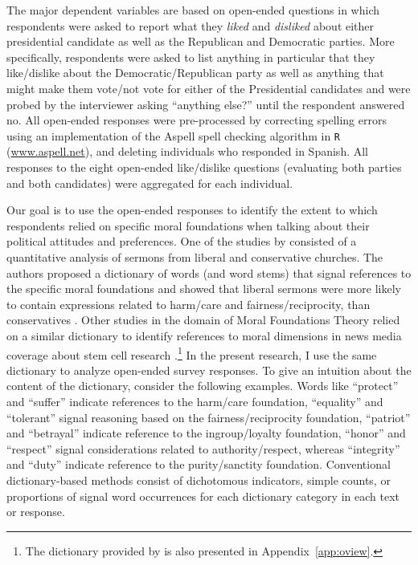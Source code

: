 \documentclass[12pt]{article}
\begin{document}
The major dependent variables are based on open-ended questions in which respondents were asked to report what they \textit{liked} and \textit{disliked} about either presidential candidate as well as the Republican and Democratic parties. More specifically, respondents were asked to list anything in particular that they like/dislike about the Democratic/Republican party as well as anything that might make them vote/not vote for either of the Presidential candidates and were probed by the interviewer asking ``anything else?'' until the respondent answered no. All open-ended responses were pre-processed by correcting spelling errors using an implementation of the Aspell spell checking algorithm in \texttt{R} (\url{www.aspell.net}), and deleting individuals who responded in Spanish. All responses to the eight open-ended like/dislike questions (evaluating both parties and both candidates) were aggregated for each individual.

Our goal is to use the open-ended responses to identify the extent to which respondents relied on specific moral foundations when talking about their political attitudes and preferences. One of the studies by \citet{graham2009liberals} consisted of a quantitative analysis of sermons from liberal and conservative churches. The authors proposed a dictionary of words (and word stems) that signal references to the specific moral foundations and showed that liberal sermons were more likely to contain expressions related to harm/care and fairness/reciprocity, than conservatives \citep[see also][for multi-dimensional conceptualizations of ideology]{haidt2009above}. Other studies in the domain of Moral Foundations Theory relied on a similar dictionary to identify references to moral dimensions in news media coverage about stem cell research \citep{clifford2013words}.\footnote{The dictionary provided by \citet{graham2009liberals} is also presented in Appendix~\ref{app:oview}.} In the present research, I use the same dictionary to analyze open-ended survey responses. To give an intuition about the content of the dictionary, consider the following examples. Words like ``protect'' and ``suffer'' indicate references to the harm/care foundation, ``equality'' and ``tolerant'' signal reasoning based on the fairness/reciprocity foundation, ``patriot'' and ``betrayal'' indicate reference to the ingroup/loyalty foundation, ``honor'' and ``respect'' signal considerations related to authority/respect, whereas ``integrity'' and ``duty'' indicate reference to the purity/sanctity foundation. Conventional dictionary-based methods consist of dichotomous indicators, simple counts, or proportions of signal word occurrences for each dictionary category in each text or response.
\end{document}
